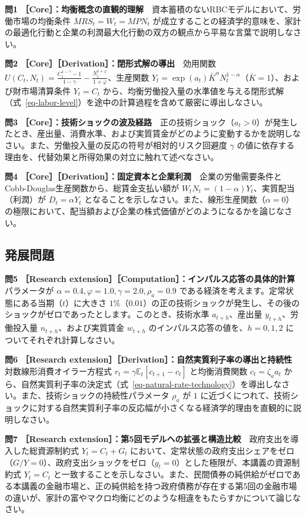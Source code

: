 \documentclass[
  japanese,
  lualatex,
  ja=standard,
  12pt,
  a4paper]{ltjsarticle}
\begin{document}
\textbf{問1
［Core］：均衡概念の直観的理解}　資本蓄積のないRBCモデルにおいて、労働市場の均衡条件
\(MRS_t = W_t = MPN_t\)
が成立することの経済学的意味を、家計の最適化行動と企業の利潤最大化行動の双方の観点から平易な言葉で説明しなさい。

\textbf{問2 ［Core］［Derivation］：閉形式解の導出}　効用関数
\(U(C_t, N_t) = \frac{C_t^{1-\gamma}-1}{1-\gamma} - \frac{N_t^{1+\varphi}}{1+\varphi}\)、生産関数
\(Y_t = \exp(a_t) \bar{K}^\alpha N_t^{1-\alpha}\)（\(\bar{K}=1\)）、および財市場清算条件
\(Y_t = C_t\)
から、均衡労働投入量の水準値を与える閉形式解（式~\ref{eq-labor-level}）を途中の計算過程を含めて厳密に導出しなさい。

\textbf{問3
［Core］：技術ショックの波及経路}　正の技術ショック（\(a_t > 0\)）が発生したとき、産出量、消費水準、および実質賃金がどのように変動するかを説明しなさい。また、労働投入量の反応の符号が相対的リスク回避度
\(\gamma\)
の値に依存する理由を、代替効果と所得効果の対立に触れて述べなさい。

\textbf{問4
［Core］［Derivation］：固定資本と企業利潤}　企業の労働需要条件とCobb-Douglas生産関数から、総賃金支払い額が
\(W_t N_t = (1-\alpha) Y_t\)、実質配当（利潤）が \(D_t = \alpha Y_t\)
となることを示しなさい。また、線形生産関数（\(\alpha = 0\)）の極限において、配当額および企業の株式価値がどのようになるかを論じなさい。

\subsection{発展問題}\label{ux767aux5c55ux554fux984c}

\textbf{問5 ［Research
extension］［Computation］：インパルス応答の具体的計算}　パラメータが
\(\alpha = 0.4, \varphi = 1.0, \gamma = 2.0, \rho_a = 0.9\)
である経済を考えます。定常状態にある当期（\(t\)）に大きさ
\(1\%\)（\(0.01\)）の正の技術ショックが発生し、その後のショックがゼロであったとします。このとき、技術水準
\(a_{t+h}\)、産出量 \(y_{t+h}\)、労働投入量 \(n_{t+h}\)、および実質賃金
\(w_{t+h}\) のインパルス応答の値を、\(h = 0, 1, 2\)
についてそれぞれ計算しなさい。

\textbf{問6 ［Research
extension］［Derivation］：自然実質利子率の導出と持続性}　対数線形消費オイラー方程式
\(r_t = \gamma \mathbb{E}_t [c_{t+1} - c_t]\) と均衡消費関数
\(c_t = \zeta_a a_t\)
から、自然実質利子率の決定式（式~\ref{eq-natural-rate-technology}）を導出しなさい。また、技術ショックの持続性パラメータ
\(\rho_a\) が \(1\)
に近づくにつれて、技術ショックに対する自然実質利子率の反応幅が小さくなる経済学的理由を直観的に説明しなさい。

\begin{samepage}

\textbf{問7 ［Research
extension］：第5回モデルへの拡張と構造比較}　政府支出を導入した総資源制約式
\(Y_t = C_t + G_t\)
において、定常状態の政府支出シェアをゼロ（\(G/Y = 0\)）、政府支出ショックをゼロ（\(g_t = 0\)）とした極限が、本講義の資源制約式
\(Y_t = C_t\)
と一致することを示しなさい。また、民間債券の純供給がゼロである本講義の金融市場と、正の純供給を持つ政府債務が存在する第5回の金融市場の違いが、家計の富やマクロ均衡にどのような相違をもたらすかについて論じなさい。

\end{samepage}
\end{document}
